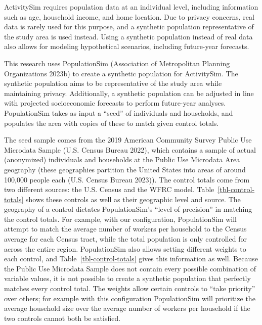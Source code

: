 \documentclass[fancy, twoside, mastersfancy, ms]{byuthesis}
\begin{document}
ActivitySim requires population data at an individual level, including
information such as age, household income, and home location. Due to
privacy concerns, real data is rarely used for this purpose, and a
synthetic population representative of the study area is used instead.
Using a synthetic population instead of real data also allows for
modeling hypothetical scenarios, including future-year forecasts.

This research uses PopulationSim (Association of Metropolitan Planning
Organizations 2023b) to create a synthetic population for ActivitySim.
The synthetic population aims to be representative of the study area
while maintaining privacy. Additionally, a synthetic population can be
adjusted in line with projected socioeconomic forecasts to perform
future-year analyses. PopulationSim takes as input a ``seed'' of
individuals and households, and populates the area with copies of these
to match given control totals.

The seed sample comes from the 2019 American Community Survey Public Use
Microdata Sample (U.S. Census Bureau 2022), which contains a sample of
actual (anonymized) individuals and households at the Public Use
Microdata Area geography (these geographies partition the United States
into areas of around 100,000 people each (U.S. Census Bureau 2023)). The
control totals come from two different sources: the U.S. Census and the
WFRC model. Table~\ref{tbl-control-totals} shows these controls as well
as their geographic level and source. The geography of a control
dictates PopulationSim's ``level of precision'' in matching the control
totals. For example, with our configuration, PopulationSim will attempt
to match the average number of workers per household to the Census
average for each Census tract, while the total population is only
controlled for across the entire region. PopulationSim also allows
setting different weights to each control, and
Table~\ref{tbl-control-totals} gives this information as well. Because
the Public Use Microdata Sample does not contain every possible
combination of variable values, it is not possible to create a synthetic
population that perfectly matches every control total. The weights allow
certain controls to ``take priority'' over others; for example with this
configuration PopulationSim will prioritize the average household size
over the average number of workers per household if the two controls
cannot both be satisfied.
\end{document}
